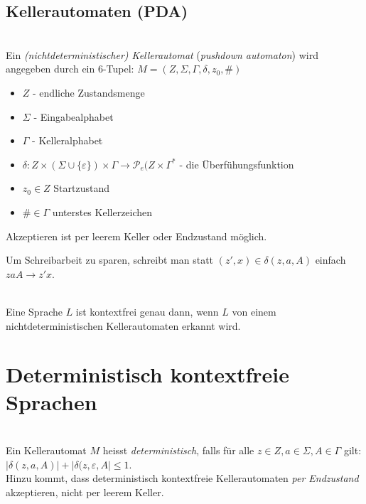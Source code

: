\documentclass{scrartcl}
\begin{document}
\subsection*{Kellerautomaten (PDA)}
\begin{shaded}
    \ \\Ein \emph{(nichtdeterministischer) Kellerautomat} (\emph{pushdown automaton}) wird angegeben durch ein 6-Tupel: $M=\left(Z,\Sigma,\Gamma,\delta,z_0,\#\right) $ \\
    \begin{minipage}[t]{0.48\textwidth}
        \begin{itemize}
            \item $Z$ - endliche Zustandsmenge
            \item $\Sigma$ - Eingabealphabet
            \item $\Gamma$ - Kelleralphabet
        \end{itemize}
    \end{minipage}
    \hfill \vrule \hfill
    \begin{minipage}[t]{0.48\textwidth}
        \begin{itemize}
            \item $ \delta:Z\times(\Sigma\cup\{\varepsilon\})\times\Gamma\to\mathcal{P}_e (Z\times\Gamma^* $ - die Überfühungsfunktion
            \item $z_0\in Z$ Startzustand
            \item $\#\in\Gamma$ unterstes Kellerzeichen
        \end{itemize}
    \end{minipage}
    Akzeptieren ist per leerem Keller oder Endzustand möglich.
\end{shaded}

Um Schreibarbeit zu sparen, schreibt man statt $(z',x)\in\delta(z,a,A)$ einfach $zaA\to z'x$.

\begin{shaded}
    \ \\Eine Sprache $L$ ist kontextfrei genau dann, wenn $L$ von einem nichtdeterministischen Kellerautomaten erkannt wird.
\end{shaded}

\section*{Deterministisch kontextfreie Sprachen}
\begin{shaded}
    \ \\Ein Kellerautomat $M$ heisst \emph{deterministisch}, falls für alle $z\in Z,a\in \Sigma, A\in\Gamma$ gilt: $|\delta(z,a,A)| + |\delta(z,\varepsilon,A|\leq 1$. \\
    Hinzu kommt, dass deterministisch kontextfreie Kellerautomaten \emph{per Endzustand} akzeptieren, nicht per leerem Keller.
\end{shaded}
\end{document}
